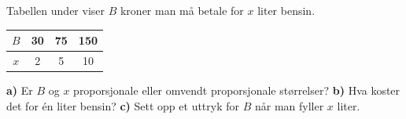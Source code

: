 Tabellen under viser $ B $ kroner man må betale for $ x $ liter bensin.
\begin{center}
	\begin{tabular}{c|c|c|c|}
		$ B $ & 30 & 75&150 \\ \hline
		$ x $ & 2 & 5 & 10
	\end{tabular}
\end{center}
\textbf{a)} Er $ B $ og $ x $ proporsjonale eller omvendt proporsjonale størrelser?\os
\textbf{b)} Hva koster det for én liter bensin? \os
\textbf{c)} Sett opp et uttryk for $ B $ når man fyller $ x $ liter.

